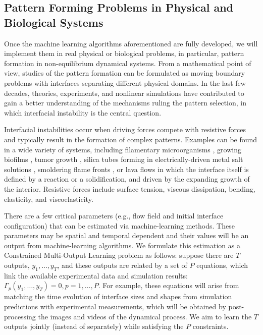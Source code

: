 \subsection{Pattern Forming Problems in Physical and Biological Systems}
Once the machine learning algorithms aforementioned are fully developed, we will implement them in real physical or biological problems, in particular, pattern formation in non-equilibrium dynamical systems.  From
a mathematical point of view, studies of the pattern formation can be
formulated as moving boundary problems with interfaces separating
different physical  domains.  In the last few decades, theories,
experiments, and nonlinear simulations have contributed to gain a
better understanding of the mechanisms ruling the pattern selection,
in which interfacial instability is the central question. 

Interfacial instabilities occur when driving forces compete with resistive forces and typically result in the formation of complex patterns. Examples can be found in a wide
variety of systems, including filamentary microorganisms \cite{alain},
growing biofilms \cite{dockery01,Mattei2018}, tumor growth  \cite{MJ2020,Kara2018}, silica tubes forming in electrically-driven metal salt solutions \cite{steinbock03,steinbock16}, smoldering flame fronts
\cite{zik98,Kagan2008}, or lava flows \cite{balmforth00, griffiths00,Roman2021} in which
the interface itself is defined by a reaction or a solidification, and
driven by the expanding growth of the interior. Resistive forces include surface tension, viscous dissipation, bending, elasticity, and viscoelasticity.

There are a few critical parameters (e.g., flow field and initial interface configuration) that can  be estimated via machine-learning methods. These parameters may be spatial and temporal dependent and their values will be an output from machine-learning algorithms. We formulate this estimation as a Constrained Multi-Output Learning problem as follows: suppose there are $T$ outputs, $y_1, \ldots, y_T$, and these outputs are related by a set of  $P$ equations, which link the available experimental data and simulation results: $\Gamma_p(y_1, \ldots, y_T)=0, p=1, \ldots, P$. For example, these equations will arise from matching the time evolution of interface sizes and shapes from simulation predictions with experimental measurements, which will be obtained by post-processing the images and videos of the  dynamical process. We aim to learn the $T$ outputs jointly (instead of separately) while satisfying the $P$ constraints. 

